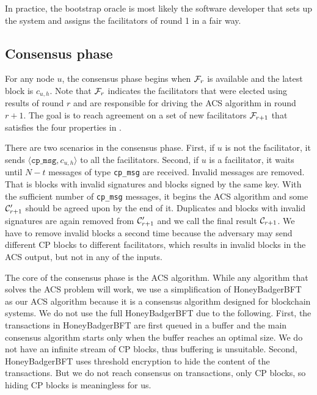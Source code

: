 In practice, the bootstrap oracle is most likely the software developer that sets up the system and assigns the facilitators of round 1 in a fair way.

\subsection{Consensus phase}
\label{sec:consensus-phase}
For any node $u$,
the consensus phase begins when $\mathcal{F}_r$ is available and the latest block is $c_{u, h}$.
Note that $\mathcal{F}_r$ indicates the facilitators that were elected using results of round $r$ and are responsible for driving the ACS algorithm in round $r + 1$.
The goal is to reach agreement on a set of new facilitators $\mathcal{F}_{r + 1}$ that satisfies the four properties in .

There are two scenarios in the consensus phase.
First, if $u$ is not the facilitator, it sends $\langle \texttt{cp\_msg}, c_{u, h} \rangle$ to all the facilitators.
Second, if $u$ is a facilitator, it waits until $N - t$ messages of type \texttt{cp\_msg} are received.
Invalid messages are removed.
That is blocks with invalid signatures and blocks signed by the same key.
With the sufficient number of \texttt{cp\_msg} messages,
it begins the ACS algorithm and some $\mathcal{C}'_{r + 1}$ should be agreed upon by the end of it.
Duplicates and blocks with invalid signatures are again removed from $\mathcal{C}'_{r+1}$ and we call the final result $\mathcal{C}_{r+1}$.
We have to remove invalid blocks a second time because the adversary may send different CP blocks to different facilitators,
which results in invalid blocks in the ACS output, but not in any of the inputs.

The core of the consensus phase is the ACS algorithm.
While any algorithm that solves the ACS problem will work,
we use a simplification of HoneyBadgerBFT~\cite{miller2016honey} as our ACS algorithm 
because it is a consensus algorithm designed for blockchain systems.
We do not use the full HoneyBadgerBFT due to the following.
First, the transactions in HoneyBadgerBFT are first queued in a buffer and the main consensus algorithm starts only when the buffer reaches an optimal size.
We do not have an infinite stream of CP blocks, thus buffering is unsuitable.
Second, HoneyBadgerBFT uses threshold encryption to hide the content of the transactions.
But we do not reach consensus on transactions, only CP blocks, so hiding CP blocks is meaningless for us.

